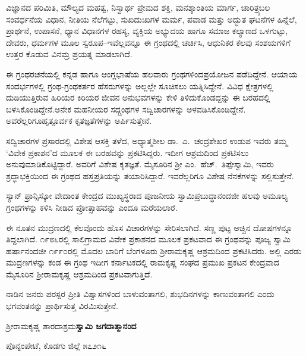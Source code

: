 ವಿಜ್ಞಾನದ ಪರಿಮಿತಿ, ಮೌಲ್ಯದ ಮಹತ್ವ, ನಿಸ್ವಾರ್ಥ ಪ್ರೇಮದ ಶಕ್ತಿ, ಮನಶ್ಶಾಂತಿಯ ಮಾರ್ಗ, ಚಾರಿತ್ರ್ಯಬಲ ಸಂವರ್ಧನೆಯ ವಿಧಾನ, ನೀತಿಯ ನೆಲೆಗಟ್ಟು, ಸುಖದುಃಖಗಳ ಮರ್ಮ, ಪವಾಡ ಮತ್ತು ಅದ್ಭುತ ಘಟನೆಗಳ ಹಿನ್ನೆಲೆ, ಪ್ರಾರ್ಥನೆ, ಉಪಾಸನೆ, ಧ್ಯಾನ ವಿಧಾನಗಳ ರಹಸ್ಯ, ವ್ಯಕ್ತಿಯ ಅಭ್ಯುದಯ ಹಾಗೂ ಸಮಾಜ ಕಲ್ಯಾಣದ ಒಳಗುಟ್ಟು, ದೇವರು, ಧರ್ಮಗಳ ಮೂಲ ಸ್ವರೂಪ–ಇವೆಲ್ಲವನ್ನೂ ಈ ಗ್ರಂಥದಲ್ಲಿ ಚರ್ಚಿಸಿ, ಆಧುನಿಕರ ಕೆಲವು ಸಂಶಯಗಳಿಗೆ ಉತ್ತರ ಕೊಡುವ ವಿನಮ್ರ ಪ್ರಯತ್ನ ಮಾಡಲಾಗಿದೆ.

ಈ ಗ್ರಂಥರಚನೆಯಲ್ಲಿ ಕನ್ನಡ ಹಾಗೂ ಆಂಗ್ಲಭಾಷೆಯ ಹಲವಾರು ಗ್ರಂಥಗಳಿಂದ\break ಪ್ರಯೋಜನ ಪಡೆದಿದ್ದೇನೆ. ಆಯಾಯ ಸಂದರ್ಭಗಳಲ್ಲಿ ಗ್ರಂಥ-ಗ್ರಂಥಕರ್ತರ ಹೆಸರುಗಳನ್ನು ಅಲ್ಲಲ್ಲೇ ಸೂಚಿಸಲು ಯತ್ನಿಸಿದ್ದೇನೆ. ವಿವಿಧ ಕ್ಷೇತ್ರಗಳಲ್ಲಿ ದುಡಿಯುತ್ತಿರುವ ಹಿರಿಯರ ಕಿರಿಯರ ಜೀವನ ಅನುಭವಗಳನ್ನು ಕೇಳಿ ತಿಳಿದುಕೊಂಡದ್ದನ್ನು ಈ ಬರಹದಲ್ಲಿ ಬಳಸಿಕೊಂಡಿದ್ದೇನೆ.\break ಅನೇಕ ಮಹನೀಯರ ಸದ್ಗ್ರಂಥಗಳ ಸದ್ವಿಚಾರಗಳನ್ನು ಅಳವಡಿಸಿಕೊಂಡಿದ್ದೇನೆ. ಅವರೆಲ್ಲರಿಗೂ\break ಹೃತ್ಪೂರ್ವಕ ಕೃತಜ್ಞತೆಗಳನ್ನು ಅರ್ಪಿಸುತ್ತೇನೆ.

ಸದ್ವಿಚಾರಗಳ ಪ್ರಸಾರದಲ್ಲಿ ವಿಶೇಷ ಆಸಕ್ತಿ ತಳೆದ, ಅಧ್ಯಾತ್ಮಶೀಲ ಡಾ.\ ಎ.\ ಚಂದ್ರಶೇಖರ ಉಡುಪ ಇವರು ತಮ್ಮ ‘ವಿವೇಕ ಪ್ರಕಾಶನ’ದ ಮೂಲಕ ಈ ಬರಹವನ್ನು ಪ್ರಕಟಿಸಿದ್ದರು. ಇದೀಗ ಆಶ್ರಮದಿಂದ ಪ್ರಕಟಿಸಲು ಅನುವುಮಾಡಿಕೊಟ್ಟಿದ್ದಾರೆ. ಅವರಿಗೆ ವಿಶೇಷ ಕೃತಜ್ಞತೆ. ಮೈಸೂರಿನ ಶ‍್ರೀ ಎಂ.\ ಹೆಚ್.\ ತಿಪ್ಪೇಸ್ವಾಮಿ, ಇವರು ಶ್ರದ್ಧಾಭಕ್ತಿಯಿಂದ ಈ ಗ್ರಂಥದ ಹಸ್ತಪ್ರತಿಯನ್ನು ತಯಾರಿಸಿದ್ದಾರೆ. ಇವರೆಲ್ಲರಿಗೂ ವಿಶೇಷ ನೆನಕೆಗಳನ್ನು ಸಲ್ಲಿಸುತ್ತೇನೆ.

ಸ್ಯಾನ್ ಫ್ರಾನ್ಸಿಸ್ಕೋ ವೇದಾಂತ ಕೇಂದ್ರದ ಮುಖ್ಯಸ್ಥರಾದ ಪೂಜನೀಯ ಸ್ವಾಮಿ\break ಪ್ರಬುದ್ಧಾನಂದಜೀ ಹಲವು ಅಮೂಲ್ಯ ಗ್ರಂಥಗಳನ್ನು ಕಳಿಸಿ ನೀಡಿದ ಪ್ರೋತ್ಸಾಹವನ್ನು ಎಂದೂ ಮರೆಯಲಾರೆ.

ಈ ನೂತನ ಮುದ್ರಣದಲ್ಲಿ ಕೆಲವೊಂದು ಹೊಸ ವಿಚಾರಗಳನ್ನು ಸೇರಿಸಲಾಗಿದೆ. ಸಣ್ಣ ಪುಟ್ಟ ಅಚ್ಚಿನ ದೋಷಗಳನ್ನೂ ತಿದ್ದಲಾಗಿದೆ. ೧೯೮೬ರಲ್ಲಿ ಸಾಲಿಗ್ರಾಮದ ವಿವೇಕ ಪ್ರಕಾಶನದ ಮೂಲಕ ಪ್ರಕಟವಾದ ಈ ಗ್ರಂಥವನ್ನು ಪೂಜ್ಯ ಸ್ವಾಮಿ ಹರ್ಷಾನಂದಜೀ ೧೯೯೦ರಲ್ಲಿ ಮೊದಲ ಬಾರಿಗೆ ಬೆಂಗಳೂರು ಶ‍್ರೀರಾಮಕೃಷ್ಣ ಆಶ್ರಮದಿಂದ ಪ್ರಕಟಿಸಿದರು. ಅಲ್ಲಿ ಎರಡು ಮುದ್ರಣಗಳನ್ನು ಕಂಡ ಈ ಗ್ರಂಥ ಇದೀಗ ಕರ್ನಾಟಕದಲ್ಲಿ ರಾಮಕೃಷ್ಣ ಸಂಘದ ಪ್ರಮುಖ ಪ್ರಕಟನ ಕೇಂದ್ರವಾದ ಮೈಸೂರಿನ ಶ‍್ರೀರಾಮಕೃಷ್ಣ ಆಶ್ರಮದಿಂದ ಪ್ರಕಟವಾಗುತ್ತಿದೆ.

\newpage

ನಾಡಿನ ಜನರು ಪರಸ್ಪರ ಪ್ರೀತಿ ವಿಶ್ವಾಸಗಳಿಂದ ಬಾಳುವಂತಾಗಲಿ, ಶುಭದಿನಗಳನ್ನು ಕಾಣು\-ವಂತಾಗಲಿ ಎಂದು ಭಗವಂತನನ್ನು ಪ್ರಾರ್ಥಿಸುತ್ತ ವಿರಮಿಸುತ್ತೇನೆ.

\bigskip

\noindent ಶ‍್ರೀರಾಮಕೃಷ್ಣ ಶಾರದಾಶ್ರಮ\hfill \textbf{ಸ್ವಾಮಿ ಜಗದಾತ್ಮಾನಂದ}

\noindent ಪೊನ್ನಂಪೇಟೆ, ಕೊಡಗು ಜಿಲ್ಲೆ ೫೭೨೧೬

